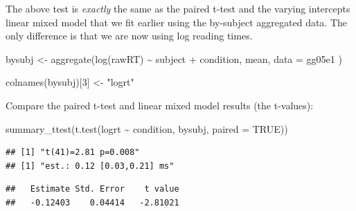 \documentclass[
  12pt,
]{krantz}
\newenvironment{Shaded}{\begin{snugshade}}{\end{snugshade}}
\newcommand{\AttributeTok}[1]{\textcolor[rgb]{0.77,0.63,0.00}{#1}}
\newcommand{\ConstantTok}[1]{\textcolor[rgb]{0.00,0.00,0.00}{#1}}
\newcommand{\DecValTok}[1]{\textcolor[rgb]{0.00,0.00,0.81}{#1}}
\newcommand{\DocumentationTok}[1]{\textcolor[rgb]{0.56,0.35,0.01}{\textbf{\textit{#1}}}}
\newcommand{\FunctionTok}[1]{\textcolor[rgb]{0.00,0.00,0.00}{#1}}
\newcommand{\NormalTok}[1]{#1}
\newcommand{\OtherTok}[1]{\textcolor[rgb]{0.56,0.35,0.01}{#1}}
\newcommand{\SpecialCharTok}[1]{\textcolor[rgb]{0.00,0.00,0.00}{#1}}
\newcommand{\StringTok}[1]{\textcolor[rgb]{0.31,0.60,0.02}{#1}}
\theoremstyle{definition}
\theoremstyle{definition}
\theoremstyle{definition}
\theoremstyle{definition}
\theoremstyle{remark}
\begin{document}
The above test is \emph{exactly} the same as the paired t-test and the varying intercepts linear mixed model that we fit earlier using the by-subject aggregated data. The only difference is that we are now using log reading times.

\begin{Shaded}
\begin{Highlighting}[]
\NormalTok{bysubj }\OtherTok{\textless{}{-}} \FunctionTok{aggregate}\NormalTok{(}\FunctionTok{log}\NormalTok{(rawRT) }\SpecialCharTok{\textasciitilde{}}\NormalTok{ subject }\SpecialCharTok{+}\NormalTok{ condition,}
\NormalTok{  mean,}
  \AttributeTok{data =}\NormalTok{ gg05e1}
\NormalTok{)}

\FunctionTok{colnames}\NormalTok{(bysubj)[}\DecValTok{3}\NormalTok{] }\OtherTok{\textless{}{-}} \StringTok{"logrt"}
\end{Highlighting}
\end{Shaded}

Compare the paired t-test and linear mixed model results (the t-values):

\begin{Shaded}
\begin{Highlighting}[]
\FunctionTok{summary\_ttest}\NormalTok{(}\FunctionTok{t.test}\NormalTok{(logrt }\SpecialCharTok{\textasciitilde{}}\NormalTok{ condition, bysubj, }
                     \AttributeTok{paired =} \ConstantTok{TRUE}\NormalTok{))}
\end{Highlighting}
\end{Shaded}

\begin{verbatim}
## [1] "t(41)=2.81 p=0.008"
## [1] "est.: 0.12 [0.03,0.21] ms"
\end{verbatim}

\begin{Shaded}
\end{Shaded}

\begin{verbatim}
##   Estimate Std. Error    t value 
##   -0.12403    0.04414   -2.81021
\end{verbatim}
\end{document}
